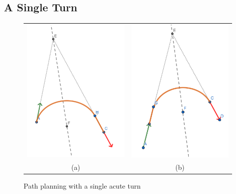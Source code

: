 \documentclass{article}
\begin{document}
\subsection*{A Single Turn}
\begin{figure}[hbt]  
  \begin{tabular}{cc}
    \includegraphics[width=3in]{screenshots/single-acute-turn-rot-trans.png} &
    \includegraphics[width=3in]{screenshots/single-acute-turn-trans-rot.png}\\
    (a) & (b)\\
  \end{tabular} 
  \caption{Path planning with a single acute turn}
  \label{fig:path1turnacute}
\end{figure}
\end{document}
